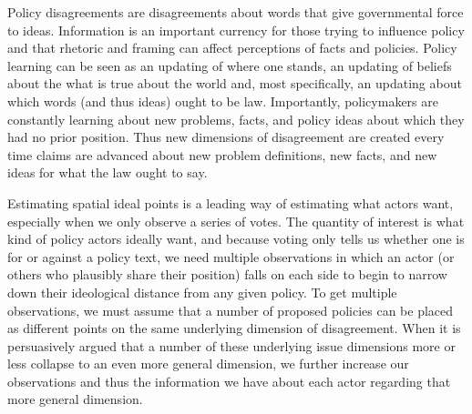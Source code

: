 



Policy disagreements are disagreements about words that give governmental force to ideas. Information is an important currency for those trying to influence policy and that rhetoric and framing can affect perceptions of facts and policies. Policy learning can be seen as an updating of where one stands, an updating of beliefs about the what is true about the world and, most specifically, an updating about which words (and thus ideas) ought to be law. Importantly, policymakers are constantly learning about new problems, facts, and policy ideas about which they had no prior position. Thus new dimensions of disagreement are created every time claims are advanced about new problem definitions, new facts, and new ideas for what the law ought to say.

Estimating spatial ideal points is a leading way of estimating what actors want, especially when we only observe a series of votes. The quantity of interest is what kind of policy actors ideally want, and because voting only tells us whether one is for or against a policy text, we need multiple observations in which an actor (or others who plausibly share their position) falls on each side to begin to narrow down their ideological distance from any given policy. To get multiple observations, we must assume that a number of proposed policies can be placed as different points on the same underlying dimension of disagreement. When it is persuasively argued that a number of these underlying issue dimensions more or less collapse to an even more general dimension, we further increase our observations and thus the information we have about each actor regarding that more general dimension. 

